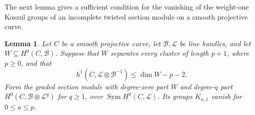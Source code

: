 \documentclass[11pt,reqno]{amsart}
\numberwithin{equation}{section}
\newtheorem{lemma}[lemma]{Lemma}
\theoremstyle{remark}
\newcommand{\shf}[1]{\mathscr{#1}}
\newcommand{\Sym}{\operatorname{Sym}}
\begin{document}
The next lemma gives a sufficient condition for the vanishing
of the weight-one Koszul groups of an incomplete twisted section
module on a smooth projective curve.

\begin{lemma}\label{lem:incomplete-weight-one}
Let \(C\) be a smooth projective curve, let \(\shf{B},\shf{L}\)
be line bundles, and let \(W\subseteq H^0(C,\shf{B})\).
Suppose that \(W\) separates every cluster of length \(p+1\),
where \(p\geq0\), and that
\begin{equation}\label{eq:incomplete-specialty}
 h^1(C,\shf{L}\otimes\shf{B}^{-1})
 \leq\dim W-p-2.
\end{equation}
Form the graded section module with degree-zero part \(W\) and
degree-\(q\) part \(H^0(C,\shf{B}\otimes\shf{L}^q)\) for
\(q\geq1\), over \(\Sym H^0(C,\shf{L})\).
Its groups \(K_{a,1}\) vanish for \(0\leq a\leq p\).
\end{lemma}
\end{document}
